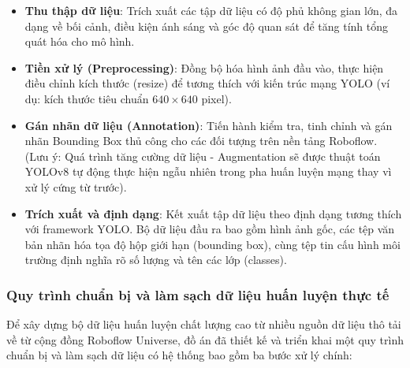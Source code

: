 \begin{itemize}
    \item \textbf{Thu thập dữ liệu}: Trích xuất các tập dữ liệu có độ phủ không gian lớn, đa dạng về bối cảnh, điều kiện ánh sáng và góc độ quan sát để tăng tính tổng quát hóa cho mô hình.
    \item \textbf{Tiền xử lý (Preprocessing)}: Đồng bộ hóa hình ảnh đầu vào, thực hiện điều chỉnh kích thước (resize) để tương thích với kiến trúc mạng YOLO (ví dụ: kích thước tiêu chuẩn $640 \times 640$ pixel).
    \item \textbf{Gán nhãn dữ liệu (Annotation)}: Tiến hành kiểm tra, tinh chỉnh và gán nhãn Bounding Box thủ công cho các đối tượng trên nền tảng Roboflow. (Lưu ý: Quá trình tăng cường dữ liệu - Augmentation sẽ được thuật toán YOLOv8 tự động thực hiện ngẫu nhiên trong pha huấn luyện mạng thay vì xử lý cứng từ trước).
    \item \textbf{Trích xuất và định dạng}: Kết xuất tập dữ liệu theo định dạng tương thích với framework YOLO. Bộ dữ liệu đầu ra bao gồm hình ảnh gốc, các tệp văn bản nhãn hóa tọa độ hộp giới hạn (bounding box), cùng tệp tin cấu hình môi trường định nghĩa rõ số lượng và tên các lớp (classes).
\end{itemize}

\subsubsection{Quy trình chuẩn bị và làm sạch dữ liệu huấn luyện thực tế}

Để xây dựng bộ dữ liệu huấn luyện chất lượng cao từ nhiều nguồn dữ liệu thô tải về từ cộng đồng Roboflow Universe, đồ án đã thiết kế và triển khai một quy trình chuẩn bị và làm sạch dữ liệu có hệ thống bao gồm ba bước xử lý chính:

